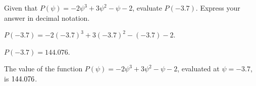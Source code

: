 \begin{shuffle}
\begin{exercise}
Given that $P(\psi)=-2 \psi ^3+3 \psi ^2-\psi -2$, evaluate $P(-3.7)$. Express your answer in decimal notation.
\begin{solution}
\begin{hint}
$P(-3.7)=-2 (-3.7) ^3+3 (-3.7) ^2-(-3.7) -2$.
\end{hint}
\begin{hint}
$P(-3.7)=144.076$.
\end{hint}
The value of the function $P(\psi)=-2 \psi ^3+3 \psi ^2-\psi -2$, evaluated at $\psi=-3.7$, is ${144.076}$.
\end{solution}
\end{exercise}
\end{shuffle}




